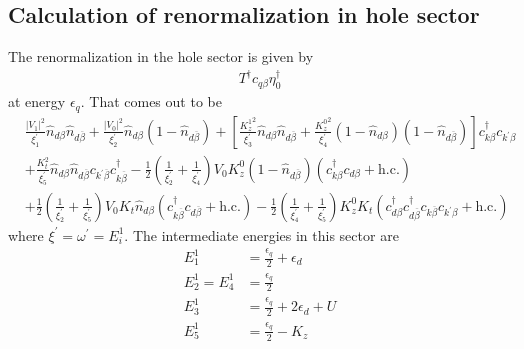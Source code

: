 \documentclass[twoside,11pt]{report}
\numberwithin{equation}{section}
\begin{document}
\subsection{Calculation of renormalization in hole sector}
The renormalization in the hole sector is given by
\begin{equation}\begin{aligned}
	T^\dagger c_{q\beta}\eta_0^\dagger
\end{aligned}\end{equation}
at energy \(\epsilon_q\). That comes out to be
\begin{equation}\begin{aligned}
&\frac{|V_1|^2}{\xi^\prime_1}\hat n_{d\beta}\hat n_{d\overline\beta} + \frac{|V_0|^2}{\xi^\prime_2}\hat n_{d\beta}\left(1 - \hat n_{d\overline\beta}\right) + \left[\frac{{K_z^1}^2}{\xi^\prime_3}\hat n_{d\beta}\hat n_{d\overline\beta} + \frac{{K_z^0}^2}{\xi^\prime_4}\left(1 - \hat n_{d\beta}\right)\left(1 - \hat n_{d\overline\beta}\right)\right]c^\dagger_{k\beta}c_{k^\prime\beta}\\
&+\frac{K_t^2}{\xi^\prime_5}\hat n_{d\beta}\hat n_{d\overline\beta}c_{k^\prime\overline\beta}c^\dagger_{k\overline\beta} - \frac{1}{2}\left(\frac{1}{\xi^\prime_2} + \frac{1}{\xi^\prime_4}\right)V_0 K_z^0\left(1 - \hat n_{d\overline\beta}\right)\left(c^\dagger_{k\beta}c_{d\beta} + \text{h.c.}\right) \\
&+ \frac{1}{2}\left(\frac{1}{\xi^\prime_2} + \frac{1}{\xi^\prime_5}\right)V_0 K_t\hat n_{d\beta}\left(c^\dagger_{k\overline\beta}c_{d\overline\beta} + \text{h.c.}\right) - \frac{1}{2}\left(\frac{1}{\xi^\prime_4} + \frac{1}{\xi^\prime_5}\right)K_z^0 K_t\left(c^\dagger_{d\beta}c^\dagger_{d\overline\beta}c_{k\overline\beta}c_{k^\prime\beta} + \text{h.c.}\right) 
\end{aligned}\end{equation}
where \(\xi^\prime = \omega^\prime = E_i^1\). The intermediate energies in this sector are
\begin{equation}\begin{aligned}
	E^1_1 &= \frac{\epsilon_q}{2} + \epsilon_d\\
	E^1_2 = E_4^1 &= \frac{\epsilon_q}{2}\\
	E^1_3 &= \frac{\epsilon_q}{2} + 2\epsilon_d + U\\
	E_5^1 &= \frac{\epsilon_q}{2} - K_z\\
\end{aligned}\end{equation}
\end{document}
